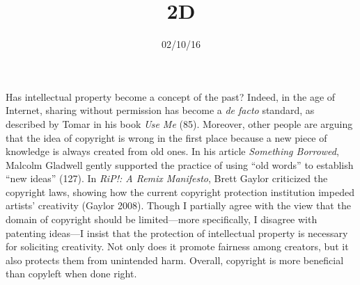 \documentclass{writing}
\title{2D}
\date{02/10/16}
\begin{document}
\maketitle

Has intellectual property become a concept of the past? Indeed, in the
age of Internet, sharing without permission has become a \emph{de facto}
standard, as described by Tomar in his book \emph{Use Me} (85).
Moreover, other people are arguing that the idea of copyright is wrong
in the first place because a new piece of knowledge is always created
from old ones. In his article \emph{Something Borrowed}, Malcolm
Gladwell gently supported the practice of using ``old words'' to
establish ``new ideas'' (127). In \emph{RiP!: A Remix Manifesto}, Brett
Gaylor criticized the copyright laws, showing how the current copyright
protection institution impeded artists' creativity (Gaylor 2008). Though
I partially agree with the view that the domain of copyright should be
limited---more specifically, I disagree with patenting ideas---I insist
that the protection of intellectual property is necessary for soliciting
creativity. Not only does it promote fairness among creators, but it
also protects them from unintended harm. Overall, copyright is more
beneficial than copyleft when done right.
\end{document}
